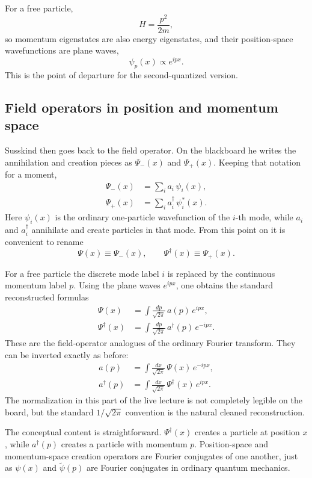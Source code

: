 For a free particle,
\begin{equation}
H=\frac{p^2}{2m},
\end{equation}
so momentum eigenstates are also energy eigenstates, and their position-space wavefunctions are plane waves,
\begin{equation}
\psi_p(x)\propto e^{ipx}.
\end{equation}
This is the point of departure for the second-quantized version.

\subsection{Field operators in position and momentum space}

Susskind then goes back to the field operator. On the blackboard he writes the annihilation and creation pieces as \(\Psi_-(x)\) and \(\Psi_+(x)\). Keeping that notation for a moment,
\begin{align}
\Psi_-(x) &= \sum_i a_i\,\psi_i(x),\\
\Psi_+(x) &= \sum_i a_i^\dagger\,\psi_i^*(x).
\end{align}
Here \(\psi_i(x)\) is the ordinary one-particle wavefunction of the \(i\)-th mode, while \(a_i\) and \(a_i^\dagger\) annihilate and create particles in that mode. From this point on it is convenient to rename
\[
\Psi(x)\equiv \Psi_-(x),
\qquad
\Psi^\dagger(x)\equiv \Psi_+(x).
\]

For a free particle the discrete mode label \(i\) is replaced by the continuous momentum label \(p\). Using the plane waves \(e^{ipx}\), one obtains the standard reconstructed formulas
\begin{align}
\Psi(x) &= \int \frac{dp}{\sqrt{2\pi}}\,a(p)\,e^{ipx},\\
\Psi^\dagger(x) &= \int \frac{dp}{\sqrt{2\pi}}\,a^\dagger(p)\,e^{-ipx}.
\end{align}
These are the field-operator analogues of the ordinary Fourier transform. They can be inverted exactly as before:
\begin{align}
a(p) &= \int \frac{dx}{\sqrt{2\pi}}\,\Psi(x)\,e^{-ipx},\\
a^\dagger(p) &= \int \frac{dx}{\sqrt{2\pi}}\,\Psi^\dagger(x)\,e^{ipx}.
\end{align}
The normalization in this part of the live lecture is not completely legible on the board, but the standard \(1/\sqrt{2\pi}\) convention is the natural cleaned reconstruction.

The conceptual content is straightforward. \(\Psi^\dagger(x)\) creates a particle at position \(x\), while \(a^\dagger(p)\) creates a particle with momentum \(p\). Position-space and momentum-space creation operators are Fourier conjugates of one another, just as \(\psi(x)\) and \(\tilde{\psi}(p)\) are Fourier conjugates in ordinary quantum mechanics.

